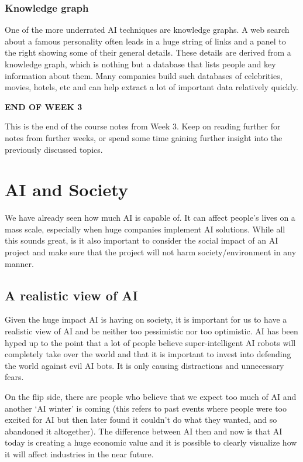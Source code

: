 \documentclass{article}[a4paper,12pt]
\theoremstyle{definition}
\begin{document}
\subsubsection{Knowledge graph}
One of the more underrated AI techniques are knowledge graphs. A web search about a famous personality often leads in a huge string of links and a panel to the right showing some of their general details. These details are derived from a knowledge graph, which is nothing but a database that lists people and key information about them. Many companies build such databases of celebrities, movies, hotels, etc and can help extract a lot of important data relatively quickly.

\hrulefill
\begin{center}
\textbf{END OF WEEK 3}
\end{center}
This is the end of the course notes from Week 3. Keep on reading further for notes from further weeks, or spend some time gaining further insight into the previously discussed topics.

\hrulefill
\pagebreak
\section{AI and Society}
We have already seen how much AI is capable of. It can affect people's lives on a mass scale, especially when huge companies implement AI solutions. While all this sounds great, is it also important to consider the social impact of an AI project and make sure that the project will not harm society/environment in any manner.
\subsection{A realistic view of AI}
Given the huge impact AI is having on society, it is important for us to have a realistic view of AI and be neither too pessimistic nor too optimistic. AI has been hyped up to the point that a lot of people believe super-intelligent AI robots will completely take over the world and that it is important to invest into defending the world against evil AI bots. It is only causing distractions and unnecessary fears.
\vspace{6pt}

On the flip side, there are people who believe that we expect too much of AI and another `AI winter' is coming (this refers to past events where people were too excited for AI but then later found it couldn't do what they wanted, and so abandoned it altogether). The difference between AI then and now is that AI today is creating a huge economic value and it is possible to clearly visualize how it will affect industries in the near future.
\vspace{6pt}
\end{document}
